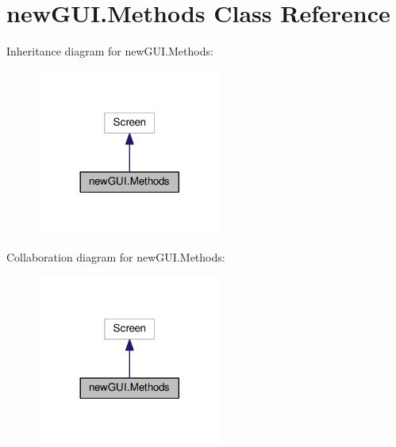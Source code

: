 \hypertarget{classnewGUI_1_1Methods}{}\section{new\+G\+U\+I.\+Methods Class Reference}
\label{classnewGUI_1_1Methods}


Inheritance diagram for new\+G\+U\+I.\+Methods\+:\nopagebreak
\begin{figure}[H]
\begin{center}
\leavevmode
\includegraphics[width=173pt]{classnewGUI_1_1Methods__inherit__graph}
\end{center}
\end{figure}


Collaboration diagram for new\+G\+U\+I.\+Methods\+:\nopagebreak
\begin{figure}[H]
\begin{center}
\leavevmode
\includegraphics[width=173pt]{classnewGUI_1_1Methods__coll__graph}
\end{center}
\end{figure}
